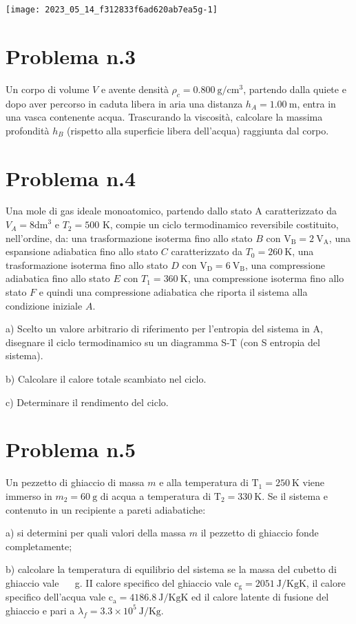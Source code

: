 \documentclass[10pt]{article}
\begin{document}
\begin{center}
\texttt{[image: 2023\_05\_14\_f312833f6ad620ab7ea5g-1]}
\end{center}

\section{Problema n.3}
Un corpo di volume \(V\) e avente densità \(\rho_{c}=0.800 \mathrm{~g} / \mathrm{cm}^{3}\), partendo dalla quiete e dopo aver percorso in caduta libera in aria una distanza \(h_{A}=1.00 \mathrm{~m}\), entra in una vasca contenente acqua. Trascurando la viscosità, calcolare la massima profondità \(h_{B}\) (rispetto alla superficie libera dell'acqua) raggiunta dal corpo.

\section{Problema n.4}
Una mole di gas ideale monoatomico, partendo dallo stato A caratterizzato da \(V_{A}=8 \mathrm{dm}^{3}\) e \(T_{2}=500\) \(\mathrm{K}\), compie un ciclo termodinamico reversibile costituito, nell'ordine, da: una trasformazione isoterma fino allo stato \(B\) con \(\mathrm{V}_{\mathrm{B}}=2 \mathrm{~V}_{\mathrm{A}}\), una espansione adiabatica fino allo stato \(C\) caratterizzato da \(T_{0}=260 \mathrm{~K}\), una trasformazione isoterma fino allo stato \(D\) con \(\mathrm{V}_{\mathrm{D}}=6 \mathrm{~V}_{\mathrm{B}}\), una compressione adiabatica fino allo stato \(E\) con \(T_{1}=360 \mathrm{~K}\), una compressione isoterma fino allo stato \(F\) e quindi una compressione adiabatica che riporta il sistema alla condizione iniziale \(A\).

a) Scelto un valore arbitrario di riferimento per l'entropia del sistema in A, disegnare il ciclo termodinamico su un diagramma S-T (con S entropia del sistema).

b) Calcolare il calore totale scambiato nel ciclo.

c) Determinare il rendimento del ciclo.

\section{Problema n.5}
Un pezzetto di ghiaccio di massa \(m\) e alla temperatura di \(\mathrm{T}_{1}=250 \mathrm{~K}\) viene immerso in \(m_{2}=60 \mathrm{~g}\) di acqua a temperatura di \(\mathrm{T}_{2}=330 \mathrm{~K}\). Se il sistema e contenuto in un recipiente a pareti adiabatiche:

a) si determini per quali valori della massa \(m\) il pezzetto di ghiaccio fonde completamente;

b) calcolare la temperatura di equilibrio del sistema se la massa del cubetto di ghiaccio vale \(\quad\) g. II calore specifico del ghiaccio vale \(\mathrm{c}_{\mathrm{g}}=2051 \mathrm{~J} / \mathrm{KgK}\), il calore specifico dell'acqua vale \(\mathrm{c}_{\mathrm{a}}=4186.8 \mathrm{~J} / \mathrm{KgK}\) ed il calore latente di fusione del ghiaccio e pari a \(\lambda_{f}=3.3 \times 10^{5} \mathrm{~J} / \mathrm{Kg}\).
\end{document}
